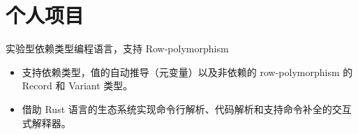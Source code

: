 \documentclass{resume}
\begin{document}
\section{个人项目}


实验型依赖类型编程语言，支持 Row-polymorphism
\begin{itemize}
  \item 支持依赖类型，值的自动推导（元变量）以及非依赖的 row-polymorphism 的 Record 和 Variant 类型。
  \item 借助 Rust 语言的生态系统实现命令行解析、代码解析和支持命令补全的交互式解释器。
\end{itemize}

\end{document}
